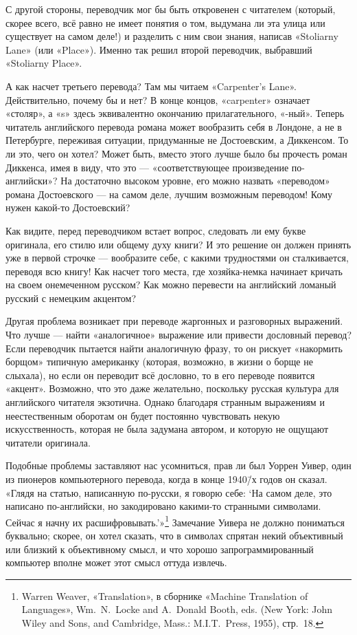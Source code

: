 \documentclass[../main.tex]{subfiles}
\begin{document}
С другой стороны, переводчик мог бы быть откровенен с читателем (который, скорее всего, всё равно не имеет понятия о том, выдумана ли эта улица или существует на самом деле!) и разделить с ним свои знания, написав «Stoliarny Lane» (или «Place»). Именно так решил второй переводчик, выбравший «Stoliarny Place».

А как насчет третьего перевода? Там мы читаем «Carpenter's Lane». Действительно, почему бы и нет? В конце концов, «carpenter» означает «столяр», а «s» здесь эквивалентно окончанию прилагательного, «-ный». Теперь читатель английского перевода романа может вообразить себя в Лондоне, а не в Петербурге, переживая ситуации, придуманные не Достоевским, а Диккенсом. То ли это, чего он хотел? Может быть, вместо этого лучше было бы прочесть роман Диккенса, имея в виду, что это --- «соответствующее произведение по-английски»? На достаточно высоком уровне, его можно назвать «переводом» романа Достоевского --- на самом деле, лучшим возможным переводом! Кому нужен какой-то Достоевский?

Как видите, перед переводчиком встает вопрос, следовать ли ему букве оригинала, его стилю или общему духу книги? И это решение он должен принять уже в первой строчке --- вообразите себе, с какими трудностями он сталкивается, переводя всю книгу! Как насчет того места, где хозяйка-немка начинает кричать на своем онемеченном русском? Как можно перевести на английский ломаный русский с немецким акцентом?

Другая проблема возникает при переводе жаргонных и разговорных выражений. Что лучше --- найти «аналогичное» выражение или привести дословный перевод? Если переводчик пытается найти аналогичную фразу, то он рискует «накормить борщом» типичную американку (которая, возможно, в жизни о борще не слыхала), но если он переводит всё дословно, то в его переводе появится «акцент». Возможно, что это даже желательно, поскольку русская культура для английского читателя экзотична. Однако благодаря странным выражениям и неестественным оборотам он будет постоянно чувствовать некую искусственность, которая не была задумана автором, и которую не ощущают читатели оригинала.

Подобные проблемы заставляют нас усомниться, прав ли был Уоррен Уивер, один из пионеров компьютерного перевода, когда в конце 1940\=/х годов он сказал. «Глядя на статью, написанную по-русски, я говорю себе: \enquote*{На самом деле, это написано по-английски, но закодировано какими-то странными символами. Сейчас я начну их расшифровывать.}»\footnote{Warren Weaver, «Translation», в сборнике «Machine Translation of Languages», Wm.~N.~Locke and A.~Donald Booth, eds. (New York: John Wiley and Sons, and Cambridge, Mass.: M.I.T.~Press, 1955), стр.~18.} Замечание Уивера не должно пониматься буквально; скорее, он хотел сказать, что в символах спрятан некий объективный или близкий к объективному смысл, и что хорошо запрограммированный компьютер вполне может этот смысл оттуда извлечь.
\end{document}
